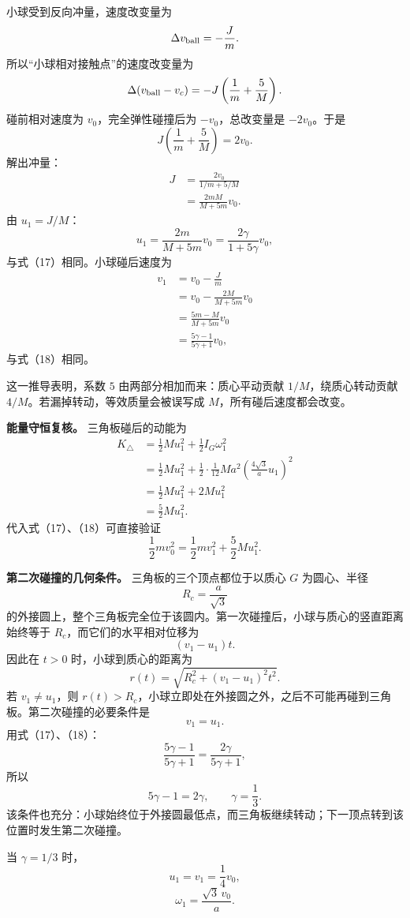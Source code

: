 \documentclass[12pt,a4paper,UTF8]{ctexart}
\begin{document}
小球受到反向冲量，速度改变量为 \[
\Delta v_{\rm ball}=-\frac Jm.
\] 所以``小球相对接触点''的速度改变量为 \[
\Delta(v_{\rm ball}-v_c)
=-J\left(
\frac1m+\frac5M
\right).
\] 碰前相对速度为 \(v_0\)，完全弹性碰撞后为 \(-v_0\)，总改变量是
\(-2v_0\)。于是 \[
J\left(
\frac1m+\frac5M
\right)=2v_0.
\] 解出冲量： \[
\begin{aligned}
J
&=\frac{2v_0}{1/m+5/M}\\
&=\frac{2mM}{M+5m}v_0.
\end{aligned}
\] 由 \(u_1=J/M\)： \[
u_1
=\frac{2m}{M+5m}v_0
=\frac{2\gamma}{1+5\gamma}v_0,
\] 与式（17）相同。小球碰后速度为 \[
\begin{aligned}
v_1
&=v_0-\frac Jm\\
&=v_0-\frac{2M}{M+5m}v_0\\
&=\frac{5m-M}{M+5m}v_0\\
&=\frac{5\gamma-1}{5\gamma+1}v_0,
\end{aligned}
\] 与式（18）相同。

这一推导表明，系数 \(5\) 由两部分相加而来：质心平动贡献
\(1/M\)，绕质心转动贡献 \(4/M\)。若漏掉转动，等效质量会被误写成
\(M\)，所有碰后速度都会改变。

\textbf{能量守恒复核。} 三角板碰后的动能为 \[
\begin{aligned}
K_\triangle
&=\frac12Mu_1^2+\frac12I_G\omega_1^2\\
&=\frac12Mu_1^2
+\frac12\cdot\frac1{12}Ma^2
\left(\frac{4\sqrt3}{a}u_1\right)^2\\
&=\frac12Mu_1^2+2Mu_1^2\\
&=\frac52Mu_1^2.
\end{aligned} \tag{20}
\] 代入式（17）、（18）可直接验证 \[
\frac12mv_0^2
=\frac12mv_1^2+\frac52Mu_1^2. \tag{21}
\]

\textbf{第二次碰撞的几何条件。} 三角板的三个顶点都位于以质心 \(G\)
为圆心、半径 \[
R_c=\frac a{\sqrt3}
\]
的外接圆上，整个三角板完全位于该圆内。第一次碰撞后，小球与质心的竖直距离始终等于
\(R_c\)，而它们的水平相对位移为 \[
(v_1-u_1)t.
\] 因此在 \(t>0\) 时，小球到质心的距离为 \[
r(t)=\sqrt{R_c^2+(v_1-u_1)^2t^2}. \tag{22}
\] 若 \(v_1\ne u_1\)，则
\(r(t)>R_c\)，小球立即处在外接圆之外，之后不可能再碰到三角板。第二次碰撞的必要条件是
\[
v_1=u_1. \tag{23}
\] 用式（17）、（18）： \[
\frac{5\gamma-1}{5\gamma+1}
=\frac{2\gamma}{5\gamma+1},
\] 所以 \[
5\gamma-1=2\gamma,
\qquad
\boxed{\gamma=\frac13}. \tag{24}
\]
该条件也充分：小球始终位于外接圆最低点，而三角板继续转动；下一顶点转到该位置时发生第二次碰撞。

当 \(\gamma=1/3\) 时， \[
u_1=v_1=\frac14v_0, \tag{25}
\] \[
\omega_1=\frac{\sqrt3\,v_0}{a}. \tag{26}
\]
\end{document}
